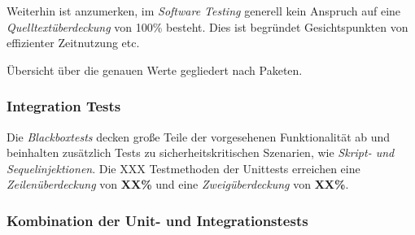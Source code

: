 \newline
Weiterhin ist anzumerken, im \emph{Software Testing} generell kein Anspruch auf eine \emph{Quelltextüberdeckung} von
100\% besteht.
Dies ist begründet Gesichtspunkten von effizienter Zeitnutzung etc.

Übersicht über die genauen Werte gegliedert nach Paketen.


\subsubsection{Integration Tests}
Die \emph{Blackboxtests} decken große Teile der vorgesehenen Funktionalität ab und beinhalten zusätzlich Tests
zu sicherheitskritischen Szenarien, wie \emph{Skript- und Sequelinjektionen}.
Die XXX Testmethoden der Unittests erreichen eine \emph{Zeilenüberdeckung} von \textbf{XX\%}
und eine \emph{Zweigüberdeckung} von \textbf{XX\%}.

\subsubsection{Kombination der Unit- und Integrationstests}
